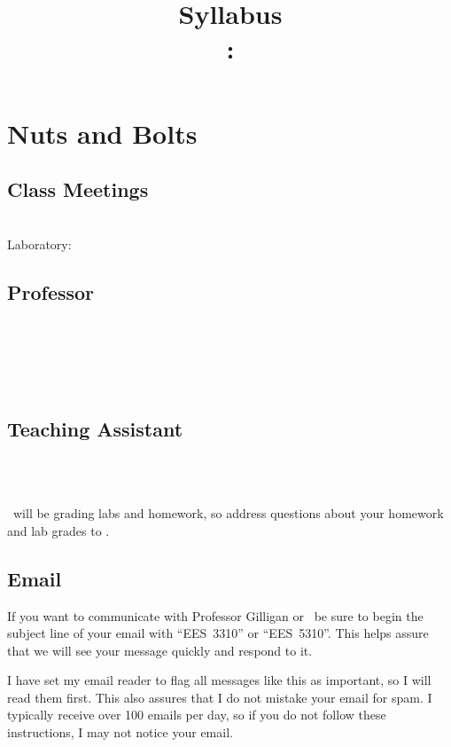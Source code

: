 \documentclass[11pt,twoside]{jgsyllabus}\usepackage[]{graphicx}\usepackage[]{color}
\title{Syllabus\\
\ShortCourseNumber: \LongCourseName}
\begin{document}
\maketitle
\tableofcontents

\clearpage
\section[Nuts \& Bolts]{Nuts and Bolts}
\label{sec:NutsAndBolts}
\subsection{Class Meetings}
\ClassMeetings\\
Laboratory: \LabMeetings
\subsection{Professor}
\label{sec:Professor}
\ProfName\\
\ProfDescr\\
\ProfEmail\\
\ProfWeb\\
\ProfOfficeHours
%

\subsection{Teaching Assistant}
\label{sec:TA}
\TaName\\
\TaEmail\\
\TaOfficeHours
\medskip

\noindent
\TaTitle\ will be grading labs and homework, so address questions about your
homework and lab grades to \TaAccusative.

\subsection{Email}
If you want to communicate with Professor Gilligan or \TaTitle\ be sure to
begin the subject line of your email with ``{\scshape EES~3310}'' or
``{\scshape EES~5310}''. This helps assure
that we will see your message quickly and respond to it.

I have set my email reader to flag all messages like this as important, so I
will read them first.
This also assures that I do not mistake your email for spam. I typically
receive over 100 emails per day, so if you do not follow these instructions,
I may not notice your email.
\end{document}
